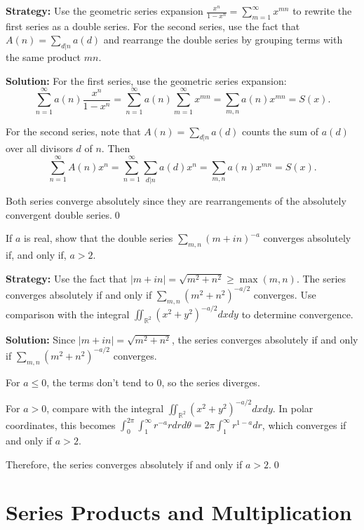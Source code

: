 \noindent\textbf{Strategy:} Use the geometric series expansion \(\frac{x^n}{1-x^n} = \sum_{m=1}^{\infty} x^{mn}\) to rewrite the first series as a double series. For the second series, use the fact that \(A(n) = \sum_{d|n} a(d)\) and rearrange the double series by grouping terms with the same product \(mn\).

\bigskip\noindent\textbf{Solution:}
For the first series, use the geometric series expansion:
\[\sum_{n=1}^{\infty} a(n) \frac{x^n}{1 - x^n} = \sum_{n=1}^{\infty} a(n) \sum_{m=1}^{\infty} x^{mn} = \sum_{m,n} a(n)x^{mn} = S(x).\]

For the second series, note that \(A(n) = \sum_{d|n} a(d)\) counts the sum of \(a(d)\) over all divisors \(d\) of \(n\). Then
\[\sum_{n=1}^{\infty} A(n)x^n = \sum_{n=1}^{\infty} \sum_{d|n} a(d) x^n = \sum_{m,n} a(n)x^{mn} = S(x).\]

Both series converge absolutely since they are rearrangements of the absolutely convergent double series.\qed



\begin{problembox}
\begin{problemstatement}
If \(a\) is real, show that the double series \(\sum_{m,n} (m + i n)^{-a}\) converges absolutely if, and only if, \(a > 2\).
\end{problemstatement}
\end{problembox}

\noindent\textbf{Strategy:} Use the fact that \(|m + i n| = \sqrt{m^2 + n^2} \geq \max(m,n)\). The series converges absolutely if and only if \(\sum_{m,n} (m^2 + n^2)^{-a/2}\) converges. Use comparison with the integral \(\iint_{\mathbb{R}^2} (x^2 + y^2)^{-a/2} dx dy\) to determine convergence.

\bigskip\noindent\textbf{Solution:}
Since \(|m + i n| = \sqrt{m^2 + n^2}\), the series converges absolutely if and only if \(\sum_{m,n} (m^2 + n^2)^{-a/2}\) converges.

For \(a \leq 0\), the terms don't tend to 0, so the series diverges.

For \(a > 0\), compare with the integral \(\iint_{\mathbb{R}^2} (x^2 + y^2)^{-a/2} dx dy\). In polar coordinates, this becomes \(\int_0^{2\pi} \int_1^{\infty} r^{-a} r dr d\theta = 2\pi \int_1^{\infty} r^{1-a} dr\), which converges if and only if \(a > 2\).

Therefore, the series converges absolutely if and only if \(a > 2\).\qed

\section{Series Products and Multiplication}



